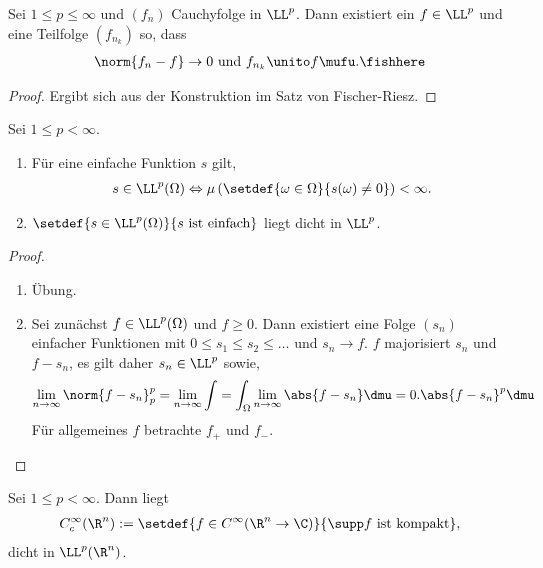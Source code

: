 \begin{cor}
\label{prop:3.74}
Sei $1\le p\le\infty$ und $(f_n)$ Cauchyfolge in $\LL^p$. Dann existiert ein
$f\in\LL^p$ und eine Teilfolge $(f_{n_k})$ so, dass
\begin{align*}
\norm{f_n-f}\to 0\text{ und } f_{n_k} \unito f\mufu.\fishhere
\end{align*}
\end{cor}
\begin{proof}
Ergibt sich aus der Konstruktion im Satz von Fischer-Riesz.\qedhere
\end{proof}

\begin{prop}
\label{prop:3.75}
Sei $1\le p<\infty$.
\begin{enumerate}[label=\arabic{*}.)]
  \item Für eine einfache Funktion $s$ gilt,
\begin{align*}
s\in \LL^p(\Omega) \Leftrightarrow
\mu\left(\setdef{\omega\in\Omega}{s(\omega)\neq 0}\right) <\infty.
\end{align*}
\item $\setdef{s\in\LL^p(\Omega)}{s\text{ ist einfach}}$ liegt dicht in
$\LL^p$.\fishhere
\end{enumerate}
\end{prop}
\begin{proof}
\begin{enumerate}[label=\arabic{*}.]
  \item Übung.
  \item Sei zunächst $f\in\LL^p(\Omega)$ und $f\ge 0$. Dann existiert eine
  Folge $(s_n)$ einfacher Funktionen mit $0\le s_1\le s_2\le \ldots$ und $s_n\to
  f$. $f$ majorisiert $s_n$ und $f-s_n$, es gilt
  daher $s_n\in \LL^p$ sowie,
\begin{align*}
\lim\limits_{n\to\infty} \norm{f-s_n}_p^p = \lim\limits_{n\to\infty} \int
= \int_\Omega \lim\limits_{n\to\infty} \abs{f-s_n}\dmu = 0.
\abs{f-s_n}^p\dmu
\end{align*}
Für allgemeines $f$ betrachte $f_+$ und $f_-$.
\end{enumerate}
\end{proof}

\begin{prop}[Ausblick]
\label{prop:3.76}
Sei $1\le p<\infty$. Dann liegt
\begin{align*}
C_c^\infty(\R^n) := \setdef{f\in C^\infty(\R^n\to\C)}{\supp f\text{ ist
kompakt}},
\end{align*}
dicht in $\LL^p(\R^n)$.\fishhere
\end{prop}

